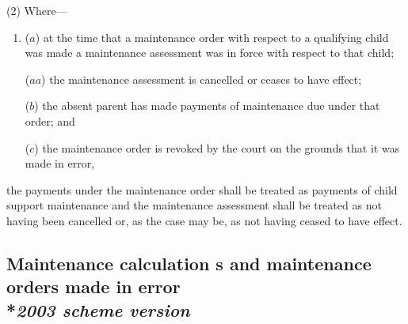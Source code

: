\documentclass[12pt,a4paper]{article}
\begin{document}
(2) Where—
\begin{enumerate}\item[]
($a$) at the time that a maintenance order with respect to a qualifying child was made a maintenance assessment was in force with respect to that child;

($aa$) the maintenance assessment is cancelled or ceases to have effect;

($b$) the absent parent has made payments of maintenance due under that order; and

($c$) the maintenance order is revoked by the court on the grounds that it was made in error,
\end{enumerate}
the payments under the maintenance order shall be treated as payments of child support maintenance and the maintenance assessment shall be treated as not having been cancelled or, as the case may be,
as not having ceased to have effect. %


\subsection[8. Maintenance 
calculation%
s and maintenance orders made in error --- \emph{2003 scheme version}]{Maintenance 
calculation%
s and maintenance orders made in error\\*\emph{2003 scheme version}}
\end{document}
